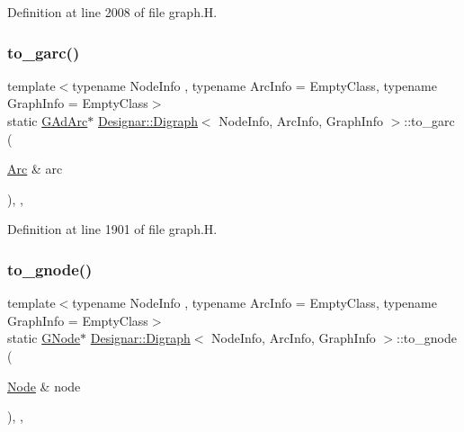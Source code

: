 Definition at line 2008 of file graph.\+H.

\mbox{\label{class_designar_1_1_digraph_a6137e6849dcb4208e9c8daa26f303868}} 
\subsubsection{\texorpdfstring{to\+\_\+garc()}{to\_garc()}}
{\footnotesize\ttfamily template$<$typename Node\+Info , typename Arc\+Info  = Empty\+Class, typename Graph\+Info  = Empty\+Class$>$ \\
static \hyperlink{class_designar_1_1_digraph_a0c6d846f23d1e82556fb6055557df53f}{G\+Ad\+Arc}$\ast$ \hyperlink{class_designar_1_1_digraph}{Designar\+::\+Digraph}$<$ Node\+Info, Arc\+Info, Graph\+Info $>$\+::to\+\_\+garc (\begin{DoxyParamCaption}\item[{\hyperlink{class_designar_1_1_digraph_a0ceb278671f2a535c00fddccdeafd69f}{Arc} \&}]{arc }\end{DoxyParamCaption})\hspace{0.3cm}{\ttfamily [inline]}, {\ttfamily [static]}, {\ttfamily [protected]}}



Definition at line 1901 of file graph.\+H.

\mbox{\label{class_designar_1_1_digraph_ae0a945e347e8e6a15df21df4fe2c1782}} 
\subsubsection{\texorpdfstring{to\+\_\+gnode()}{to\_gnode()}}
{\footnotesize\ttfamily template$<$typename Node\+Info , typename Arc\+Info  = Empty\+Class, typename Graph\+Info  = Empty\+Class$>$ \\
static \hyperlink{class_designar_1_1_digraph_a33b0d2b8820ada501522b0e67e63524a}{G\+Node}$\ast$ \hyperlink{class_designar_1_1_digraph}{Designar\+::\+Digraph}$<$ Node\+Info, Arc\+Info, Graph\+Info $>$\+::to\+\_\+gnode (\begin{DoxyParamCaption}\item[{\hyperlink{class_designar_1_1_digraph_a4dc921c41a480b7946a04170e997d8ae}{Node} \&}]{node }\end{DoxyParamCaption})\hspace{0.3cm}{\ttfamily [inline]}, {\ttfamily [static]}, {\ttfamily [protected]}}



